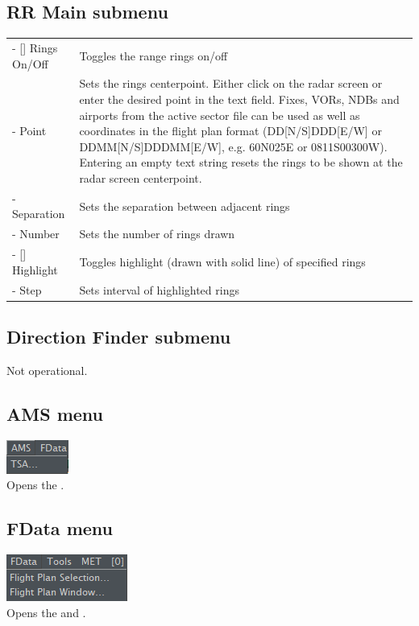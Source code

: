 \documentclass[11pt,a4paper,oldfontcommands]{memoir}
\begin{document}
\subsection*{RR Main submenu}
\begin{tabular}{p{5cm}p{10cm}}
    - [] Rings On/Off & Toggles the range rings on/off
    \\- Point & Sets the rings centerpoint. Either click on the radar screen or
    enter the desired point in the text field. Fixes, VORs, NDBs and
    airports from the active sector file can be used as well as
    coordinates in the flight plan format (DD[N/S]DDD[E/W] or
    DDMM[N/S]DDDMM[E/W], e.g. 60N025E or 0811S00300W).
    Entering an empty text string resets the rings to be shown at
    the radar screen centerpoint.
    \\- Separation & Sets the separation between adjacent rings
    \\- Number & Sets the number of rings drawn
    \\- [] Highlight & Toggles highlight (drawn with solid line) of specified rings
    \\- Step & Sets interval of highlighted rings
\end{tabular}

\subsection*{Direction Finder submenu}
Not operational.

\subsection{AMS menu}
\includegraphics{img/AMS.png}\\
Opens the \textit{}.

\subsection{FData menu}
\includegraphics{img/FData.png}\\
Opens the \textit{} and \textit{}.
\end{document}
